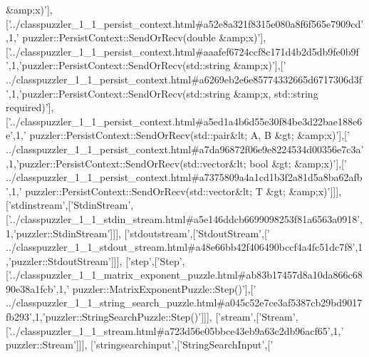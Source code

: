 \begin{DoxyCode}
{       &amp;x)'}],[\textcolor{stringliteral}{'../classpuzzler\_1\_1\_persist\_context.html#a52e8a321f8315e080a8f6f565e7909cd'},1,\textcolor{stringliteral}{'
      puzzler::PersistContext::SendOrRecv(double &amp;x)'}],[\textcolor{stringliteral}{'../classpuzzler\_1\_1\_persist\_context.html#aaafef6724ccf8c171d4b2d5db9fe0b9f
      '},1,\textcolor{stringliteral}{'puzzler::PersistContext::SendOrRecv(std::string &amp;x)'}],[\textcolor{stringliteral}{'
      ../classpuzzler\_1\_1\_persist\_context.html#a6269eb2e6e85774332665d6717306d3f'},1,\textcolor{stringliteral}{'puzzler::PersistContext::SendOrRecv(std::string &amp;x, std::string
       required)'}],[\textcolor{stringliteral}{'../classpuzzler\_1\_1\_persist\_context.html#a5ed1a4b6d55e30f84be3d22bae188e6e'},1,\textcolor{stringliteral}{'
      puzzler::PersistContext::SendOrRecv(std::pair&lt; A, B &gt; &amp;x)'}],[\textcolor{stringliteral}{'
      ../classpuzzler\_1\_1\_persist\_context.html#a7da96872f06e9e8224534d00356e7c3a'},1,\textcolor{stringliteral}{'puzzler::PersistContext::SendOrRecv(std::vector&lt; bool &gt; &amp;x)'}],[\textcolor{stringliteral}{'
      ../classpuzzler\_1\_1\_persist\_context.html#a7375809a4a1cd1b3f2a81d5a8ba62afb'},1,\textcolor{stringliteral}{'
      puzzler::PersistContext::SendOrRecv(std::vector&lt; T &gt; &amp;x)'}]]],
  [\textcolor{stringliteral}{'stdinstream'},[\textcolor{stringliteral}{'StdinStream'},[\textcolor{stringliteral}{'../classpuzzler\_1\_1\_stdin\_stream.html#a5e146ddcb6699098253f81a6563a0918'},
      1,\textcolor{stringliteral}{'puzzler::StdinStream'}]]],
  [\textcolor{stringliteral}{'stdoutstream'},[\textcolor{stringliteral}{'StdoutStream'},[\textcolor{stringliteral}{'
      ../classpuzzler\_1\_1\_stdout\_stream.html#a48e66bb42f406490bccf4a4fc51dc7f8'},1,\textcolor{stringliteral}{'puzzler::StdoutStream'}]]],
  [\textcolor{stringliteral}{'step'},[\textcolor{stringliteral}{'Step'},[\textcolor{stringliteral}{'../classpuzzler\_1\_1\_matrix\_exponent\_puzzle.html#ab83b17457d8a10da866c6890e38a1fcb'},1,\textcolor{stringliteral}{'
      puzzler::MatrixExponentPuzzle::Step()'}],[\textcolor{stringliteral}{'
      ../classpuzzler\_1\_1\_string\_search\_puzzle.html#a045c52e7ce3af5387cb29bd9017fb293'},1,\textcolor{stringliteral}{'puzzler::StringSearchPuzzle::Step()'}]]],
  [\textcolor{stringliteral}{'stream'},[\textcolor{stringliteral}{'Stream'},[\textcolor{stringliteral}{'../classpuzzler\_1\_1\_stream.html#a723d56e05bbce43eb9a63c2db96acf65'},1,\textcolor{stringliteral}{'
      puzzler::Stream'}]]],
  [\textcolor{stringliteral}{'stringsearchinput'},[\textcolor{stringliteral}{'StringSearchInput'},[\textcolor{stringliteral}{'
}
\end{DoxyCode}

